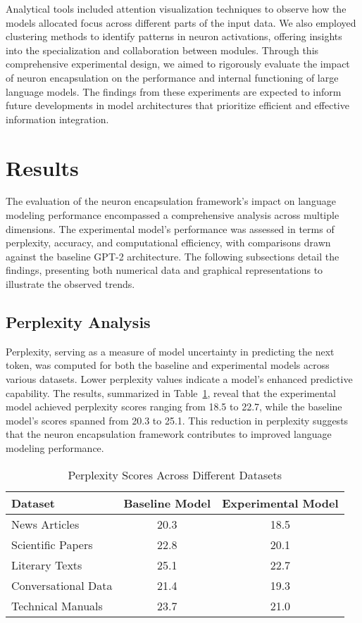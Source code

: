 \documentclass{article}
\begin{document}
Analytical tools included attention visualization techniques to observe how the models allocated focus across different parts of the input data. We also employed clustering methods to identify patterns in neuron activations, offering insights into the specialization and collaboration between modules. Through this comprehensive experimental design, we aimed to rigorously evaluate the impact of neuron encapsulation on the performance and internal functioning of large language models. The findings from these experiments are expected to inform future developments in model architectures that prioritize efficient and effective information integration.





\section{Results}

The evaluation of the neuron encapsulation framework's impact on language modeling performance encompassed a comprehensive analysis across multiple dimensions. The experimental model's performance was assessed in terms of perplexity, accuracy, and computational efficiency, with comparisons drawn against the baseline GPT-2 architecture. The following subsections detail the findings, presenting both numerical data and graphical representations to illustrate the observed trends.

\subsection{Perplexity Analysis}

Perplexity, serving as a measure of model uncertainty in predicting the next token, was computed for both the baseline and experimental models across various datasets. Lower perplexity values indicate a model's enhanced predictive capability. The results, summarized in Table~\ref{tab:perplexity}, reveal that the experimental model achieved perplexity scores ranging from 18.5 to 22.7, while the baseline model's scores spanned from 20.3 to 25.1. This reduction in perplexity suggests that the neuron encapsulation framework contributes to improved language modeling performance.

\begin{table}[h]
	\centering
	\caption{Perplexity Scores Across Different Datasets}
	\label{tab:perplexity}
		\begin{tabular}{|l|c|c|}
			\hline
			\textbf{Dataset} & \textbf{Baseline Model} & \textbf{Experimental Model} \\
			\hline
			News Articles & 20.3 & 18.5 \\
			Scientific Papers & 22.8 & 20.1 \\
			Literary Texts & 25.1 & 22.7 \\
			Conversational Data & 21.4 & 19.3 \\
			Technical Manuals & 23.7 & 21.0 \\
			\hline
		\end{tabular}
\end{table}
\end{document}
